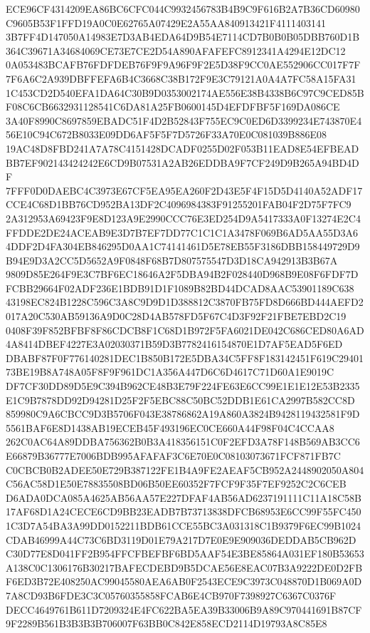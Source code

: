 \documentclass[UTF8,fontset=fandol,zihao=-4,a4paper]{ctexart}
\begin{document}
{{ECE96CF4314209EA86BC6CFC044C9932456783B4B9C9F616B2A7B36CD60980C9605B53F1FFD19A0C0E62765A07429E2A55AA840913421F4111403141
3B7FF4D147050A14983E7D3AB4EDA64D9B54E7114CD7B0B0B05DBB760D1B364C39671A34684069CE73E7CE2D54A890AFAFEFC8912341A4294E12DC12
0A053483BCAFB76FDFDEB76F9F9A96F9F2E5D38F9CC0AE552906CC017F7F7F6A6C2A939DBFFEFA6B4C3668C38B172F9E3C79121A0A4A7FC58A15FA31
1C453CD2D540EFA1DA64C30B9D0353002174AE556E38B4338B6C97C9CED85BF08C6CB6632931128541C6DA81A25FB0600145D4EFDFBF5F169DA086CE
3A40F8990C8697859EBADC51F4D2B52843F755EC9C0ED6D3399234E743870E456E10C94C672B8033E09DD6AF5F5F7D5726F33A70E0C081039B886E08
19AC48D8FBD241A7A78C4151428DCADF0255D02F053B11EAD8E54EFBEADBB7EF902143424242E6CD9B07531A2AB26EDDBA9F7CF249D9B265A94BD4DF
7FFF0D0DAEBC4C3973E67CF5EA95EA260F2D43E5F4F15D5D4140A52ADF17CCE4C68D1BB76CD952BA13DF2C4096984383F91255201FAB04F2D75F7FC9
2A312953A69423F9E8D123A9E2990CCC76E3ED254D9A5417333A0F13274E2C4FFDDE2DE24ACEAB9E3D7B7EF7DD77C1C1C1A3478F069B6AD5AA55D3A6
4DDF2D4FA304EB846295D0AA1C74141461D5E78EB55F3186DBB158449729D9B94E9D3A2CC5D5652A9F0848F68B7D807575547D3D18CA942913B3B67A
9809D85E264F9E3C7BF6EC18646A2F5DBA94B2F028440D968B9E08F6FDF7DFCBB29664F02ADF236E1BDB91D1F1089B82BD44DCAD8AAC53901189C638
43198EC824B1228C596C3A8C9D9D1D388812C3870FB75FD8D666BD444AEFD2017A20C530AB59136A9D0C28D4AB578FD5F67C4D3F92F21FBE7EBD2C19
0408F39F852BFBF8F86CDCB8F1C68D1B972F5FA6021DE042C686CED80A6AD4A8414DBEF4227E3A02030371B59D3B7782416154870E1D7AF5EAD5F6ED
DBABF87F0F776140281DEC1B850B172E5DBA34C5FF8F183142451F619C2940173BE19B8A748A05F8F9F961DC1A356A447D6C6D4617C71D60A1E9019C
DF7CF30DD89D5E9C394B962CE48B3E79F224FE63E6CC99E1E1E12E53B2335E1C9B7878DD92D94281D25F2F5EBC88C50BC52DDB1E61CA2997B582CC8D
859980C9A6CBCC9D3B5706F043E38786862A19A860A3824B9428119432581F9D5561BAF6E8D1438AB19ECEB45F493196EC0CE660A44F98F04C4CCAA8
262C0AC64A89DDBA756362B0B3A418356151C0F2EFD3A78F148B569AB3CC6E66879B36777E7006BDB995AFAFAF3C6E70E0C08103073671FCF871FB7C
C0CBCB0B2ADEE50E729B387122FE1B4A9FE2AEAF5CB952A2448902050A804C56AC58D1E50E78835508BD06B50EE60352F7FCF9F35F7EF9252C2C6CEB
D6ADA0DCA085A4625AB56AA57E227DFAF4AB56AD6237191111C11A18C58B17AF68D1A24CECE6CD9BB23EADB7B73713838DFCB68953E6CC99F55FC450
1C3D7A54BA3A99DD0152211BDB61CCE55BC3A031318C1B9379F6EC99B1024CDAB46999A44C73C6BD3119D01E79A217D7E0E9E909036DEDDAB5CB962D
C30D77E8D041FF2B954FFCFBEFBF6BD5AAF54E3BE85864A031EF180B53653A138C0C1306176B30217BAFECDEBD9B5DCAE56E8EAC07B3A9222DE0D2FB
F6ED3B72E408250AC99045580AEA6AB0F2543ECE9C3973C048870D1B069A0D7A8CD93B6FDE3C3C05760355858FCAB6E4CB970F7398927C6367C0376F
DECC4649761B611D7209324E4FC622BA5EA39B33006B9A89C970441691B87CF9F2289B561B3B3B3B706007F63BB0C842E858ECD2114D19793A8C85E8
}}
\end{document}
